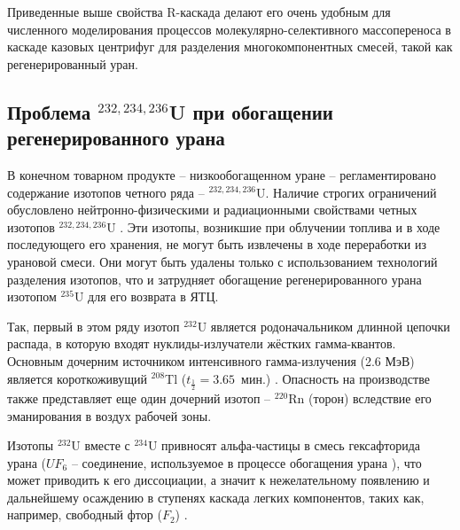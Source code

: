 Приведенные выше свойства R-каскада делают его очень удобным для численного моделирования процессов молекулярно-селективного массопереноса в каскаде казовых центрифуг для разделения многокомпонентных смесей, такой как регенерированный уран.

\subsection{Проблема $^{232,234,236}$U при обогащении регенерированного урана}

В конечном товарном продукте -- низкообогащенном уране -- регламентировано содержание изотопов четного ряда -- $^{232,234,236}$U.
Наличие строгих ограничений обусловлено нейтронно-физическими и радиационными свойствами четных изотопов $^{232,234,236}$U \cite{smirnovEvolutionIsotopicComposition2012, proselkovAnalizVozmozhnostiIspolzovaniya2003, dudnikovInfluence236UEfficacy2016}.
Эти изотопы, возникшие при облучении топлива и в ходе последующего его хранения, не могут быть извлечены в ходе переработки из урановой смеси. Они могут быть удалены только с использованием технологий разделения изотопов, что и затрудняет обогащение регенерированного урана изотопом $^{235}$U для его возврата в ЯТЦ.

Так, первый в этом ряду изотоп $^{232}$U является родоначальником длинной цепочки распада, в которую входят нуклиды-излучатели жёстких гамма-квантов.
Основным дочерним источником интенсивного гамма-излучения (2.6 МэВ) является короткоживущий $^{208}$Tl ($t_{\frac{1}{2}}=3.65$ мин.) \cite{matveevUran232EgoVliyanie1985,abbasProliferationResistanceFeatures2013}. Опасность на производстве также представляет еще один дочерний изотоп -- $^{220}$Rn (торон) вследствие его эманирования в воздух рабочей зоны.

Изотопы $^{232}$U вместе с $^{234}$U привносят альфа-частицы в смесь гексафторида урана ($UF_6$ -- соединение, используемое в процессе обогащения урана \cite{orlovWayObtainUranium2015, orlovDesublimationPurificationTransporting2017}), что может приводить к его диссоциации, а значит к нежелательному появлению и дальнейшему осаждению в ступенях каскада легких компонентов, таких как, например, свободный фтор ($F_2$) \cite{kryuchkovObogashchennyyUranDobavleniem2007, bernhardtRadiationEffectsAlpha1958, shmelevRazrabotkaRaschetnoyModeli2012}.

